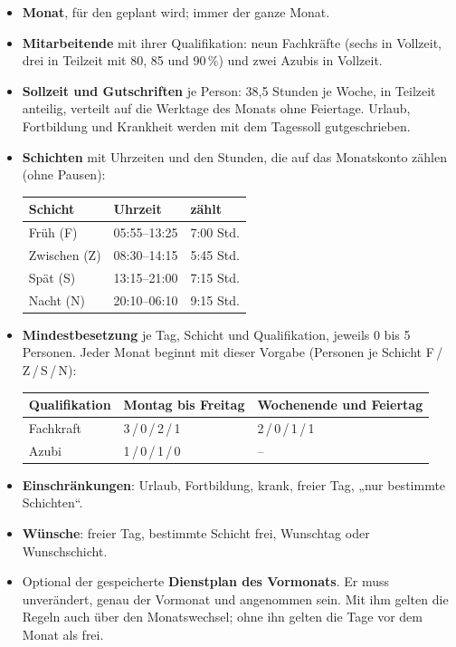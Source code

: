 \documentclass[11pt]{combiArticle}
\begin{document}
\begin{itemize}
  \item \textbf{Monat}, für den geplant wird; immer der ganze Monat.
  \item \textbf{Mitarbeitende} mit ihrer Qualifikation: neun Fachkräfte (sechs in Vollzeit, drei in Teilzeit mit
        80, 85 und 90\,\%) und zwei Azubis in Vollzeit.
  \item \textbf{Sollzeit und Gutschriften} je Person: 38,5 Stunden je Woche, in Teilzeit anteilig, verteilt auf die
        Werktage des Monats ohne Feiertage. Urlaub, Fortbildung und Krankheit werden mit dem Tagessoll
        gutgeschrieben.
  \item \textbf{Schichten} mit Uhrzeiten und den Stunden, die auf das Monatskonto zählen (ohne Pausen):

        \begin{tabular}{l l l}
          \hline
          Schicht & Uhrzeit & zählt \\
          \hline
          Früh (F) & 05:55--13:25 & 7:00 Std. \\
          Zwischen (Z) & 08:30--14:15 & 5:45 Std. \\
          Spät (S) & 13:15--21:00 & 7:15 Std. \\
          Nacht (N) & 20:10--06:10 & 9:15 Std. \\
          \hline
        \end{tabular}
  \item \textbf{Mindestbesetzung} je Tag, Schicht und Qualifikation, jeweils 0 bis 5 Personen. Jeder Monat
        beginnt mit dieser Vorgabe (Personen je Schicht F\,/\,Z\,/\,S\,/\,N):

        \begin{tabular}{l l l}
          \hline
          Qualifikation & Montag bis Freitag & Wochenende und Feiertag \\
          \hline
          Fachkraft & 3\,/\,0\,/\,2\,/\,1 & 2\,/\,0\,/\,1\,/\,1 \\
          Azubi & 1\,/\,0\,/\,1\,/\,0 & -- \\
          \hline
        \end{tabular}
  \item \textbf{Einschränkungen}: Urlaub, Fortbildung, krank, freier Tag, „nur bestimmte Schichten“.
  \item \textbf{Wünsche}: freier Tag, bestimmte Schicht frei, Wunschtag oder Wunschschicht.
  \item Optional der gespeicherte \textbf{Dienstplan des Vormonats}. Er muss unverändert, genau der Vormonat und
        angenommen sein. Mit ihm gelten die Regeln auch über den Monatswechsel; ohne ihn gelten die Tage vor dem
        Monat als frei.
\end{itemize}
\end{document}
